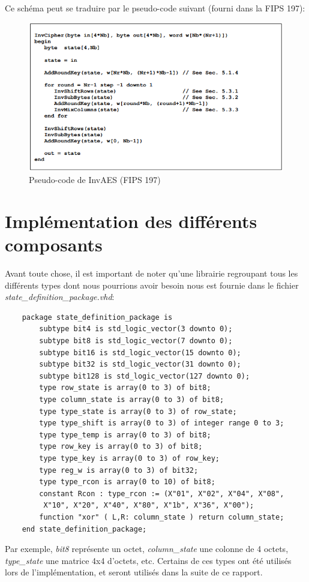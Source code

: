 \documentclass[a4paper, 12pt]{article}
\begin{document}
Ce schéma peut se traduire par le pseudo-code suivant (fourni dans la FIPS 197): 
	\begin{figure}[H]
	\begin{center}
	\includegraphics[scale=0.8]{Images/InvAESPseudoCode.png}
	\end{center}
	\caption{Pseudo-code de InvAES (FIPS 197)}
	\label{InvAES algorigramme}
	\end{figure}

\section{Implémentation des différents composants}
	Avant toute chose, il est important de noter qu'une librairie regroupant tous les différents types dont nous pourrions avoir besoin nous est fournie dans le fichier\\ \emph{state\_definition\_package.vhd}: 
	\begin{lstlisting}
	package state_definition_package is
  		subtype bit4 is std_logic_vector(3 downto 0);
  		subtype bit8 is std_logic_vector(7 downto 0);
 		subtype bit16 is std_logic_vector(15 downto 0);
  		subtype bit32 is std_logic_vector(31 downto 0);
 		subtype bit128 is std_logic_vector(127 downto 0);
  		type row_state is array(0 to 3) of bit8;
  		type column_state is array(0 to 3) of bit8;
  		type type_state is array(0 to 3) of row_state;
  		type type_shift is array(0 to 3) of integer range 0 to 3;
  		type type_temp is array(0 to 3) of bit8;
  		type row_key is array(0 to 3) of bit8;
  		type type_key is array(0 to 3) of row_key;
  		type reg_w is array(0 to 3) of bit32;
  		type type_rcon is array(0 to 10) of bit8;
  		constant Rcon : type_rcon := (X"01", X"02", X"04", X"08",
  		 X"10", X"20", X"40", X"80", X"1b", X"36", X"00");	
  		function "xor" ( L,R: column_state ) return column_state; 
	end state_definition_package;
	\end{lstlisting}
	Par exemple, \emph{bit8} représente un octet, \emph{column\_state} une colonne de 4 octets, \emph{type\_state} une matrice 4x4 d'octets, etc. Certains de ces types ont été utilisés lors de l'implémentation, et seront utilisés dans la suite de ce rapport.
	
\end{document}
